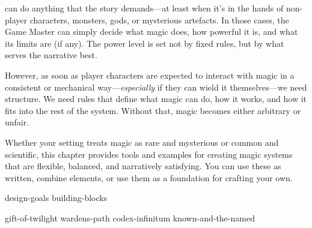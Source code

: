 
 can do anything that the story demands—at least when it’s in the hands of non-player characters, monsters, gods, or mysterious artefacts. In those cases, the Game Master can simply decide what magic does, how powerful it is, and what its limits are (if any). The power level is set not by fixed rules, but by what serves the narrative best.

However, as soon as player characters are expected to interact with magic in a consistent or mechanical way—\emph{especially} if they can wield it themselves—we need structure. We need rules that define what magic can do, how it works, and how it fits into the rest of the system. Without that, magic becomes either arbitrary or unfair.

Whether your setting treats magic as rare and mysterious or common and scientific, this chapter provides tools and examples for creating magic systems that are flexible, balanced, and narratively satisfying. You can use these as written, combine elements, or use them as a foundation for crafting your own.

{design-goals}
{building-blocks}

{gift-of-twilight}
{wardens-path}
{codex-infinitum}
{known-and-the-named}





